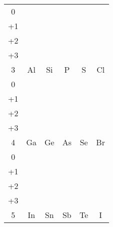 \documentclass{article}
\begin{document}
{{\begin{table}[H]
{\begin{tabular}{*{6}{c}}
	0
	& 
	& 
	& 
	& 
	& 
	
	\\
	
	+1
	& 
	& 
	& 
	& 
	& 
	
	\\
	
	+2
	& 
	& 
	& 
	& 
	& 
	
	\\
	
	+3
	& \HSABemphH
	& 
	& 
	& 
	& 
	
	\\ \midrule
	
	3
	& Al
	& Si
	& P
	& S
	& Cl
	
	
	\\ \midrule
	
	0
	& \HSABemphH
	& \HSABemphH
	& \HSABemphH
	& \HSABemphH
	& 
	
	\\
	
	+1
	& \HSABemphH
	& \HSABemphH
	& \HSABemphH
	& \HSABemphH
	& 
	
	\\
	
	+2
	& \HSABemphH
	& \HSABemphH
	& \HSABemphH
	& \HSABemphH
	& 
	
	\\
	
	+3
	& \HSABemphH
	& \HSABemphH
	& \HSABemphH
	& \HSABemphH
	& 
	
	\\ \midrule
	
	4
	& Ga
	& Ge
	& As
	& Se
	& Br
	
	\\ \midrule
	
	0
	& \HSABemphH
	& \HSABemphH
	& \HSABemphH
	& \HSABemphH
	& 
	
	\\
	
	+1
	& \HSABemphH
	& \HSABemphH
	& \HSABemphH
	& \HSABemphH
	& 
	
	\\
	
	+2
	& \HSABemphH
	& \HSABemphH
	& \HSABemphH
	& \HSABemphH
	& 
	
	\\
	
	+3
	& \HSABemphH
	& \HSABemphH
	& \HSABemphH
	& \HSABemphH
	& 
	
	\\ \midrule
	
	5
	& In
	& Sn
	& Sb
	& Te
	& I
	
	\\ \midrule
	

\end{tabular}}
\end{table}}}
\end{document}
